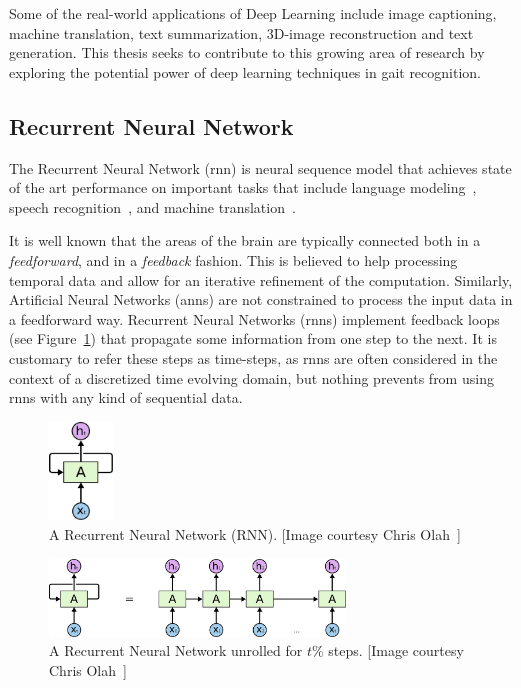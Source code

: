 Some of the real-world applications of Deep Learning include image captioning, machine translation, text summarization, 3D-image reconstruction and text generation. This thesis seeks to contribute to this growing area of research by exploring the potential power of deep learning techniques in gait recognition. 



\subsection{Recurrent Neural Network} 
The Recurrent Neural Network (\gls{rnn}) is neural sequence model that achieves state of the art performance on important tasks that include language modeling~\cite{mikolov_12}, speech recognition~\cite{graves_13}, and machine translation~\cite{kal_13}.  

It is well known that the areas of the brain are typically connected both in a \emph{feedforward}, and in a \emph{feedback} fashion. This is believed to help processing temporal data and allow for an iterative refinement of the computation. Similarly, Artificial Neural Networks (\gls{ann}s) are not constrained to process the input data in a feedforward way. Recurrent Neural Networks (\gls{rnn}s) implement feedback loops (see Figure~\ref{fig:RNN_loop}) that propagate some information from one step to the next. It is customary to refer these steps as time-steps, as \gls{rnn}s are often considered in the context of a discretized time evolving domain, but nothing prevents from using \gls{rnn}s with any kind of sequential data.

\begin{figure}[t]
	\centering
	\includegraphics[width=0.15\textwidth]{figures/RNN_loop.pdf}
	\caption{A Recurrent Neural Network (RNN). [Image courtesy Chris Olah~\cite{colah_15}]\label{fig:RNN_loop}}
\end{figure}

\begin{figure}[t!]
	\centering
	\includegraphics[width=0.7\textwidth]{figures/RNN_unrolled.pdf}
	\caption{A Recurrent Neural Network unrolled for $t$\% steps. [Image courtesy Chris Olah~\cite{colah_15}]\label{fig:RNN_unrolled}}
\end{figure}

